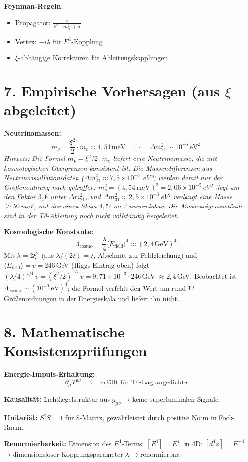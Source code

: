 	\textbf{Feynman-Regeln:}
	\begin{itemize}
		\item Propagator: $\frac{i}{k^2 - m_{\text{eff}}^2 + i\epsilon}$
		\item Vertex: $-i\lambda$ für $E^4$-Kopplung
		\item $\xi$-abhängige Korrekturen für Ableitungskopplungen
	\end{itemize}
	
	\section*{7. Empirische Vorhersagen (aus $\xi$ abgeleitet)}
	
	\textbf{Neutrinomassen:}
	\[
	m_\nu = \frac{\xi^2}{2} \cdot m_e \approx 4{,}54 \, \text{meV} \quad \Rightarrow \quad \Delta m_{21}^2 \sim 10^{-5} \, \text{eV}^2
	\]
	\textit{Hinweis: Die Formel $m_\nu = \xi^2/2 \cdot m_e$ liefert eine Neutrinomasse, die mit kosmologischen Obergrenzen konsistent ist. Die Massendifferenzen aus Neutrinooszillationsdaten ($\Delta m^2_{21} \approx 7{,}5 \times 10^{-5}$ eV²) werden damit nur der Größenordnung nach getroffen: $m_\nu^2 = (4{,}54\,\text{meV})^2 = 2{,}06\times10^{-5}$\,eV$^2$ liegt um den Faktor $3{,}6$ unter $\Delta m^2_{21}$, und $\Delta m^2_{31} \approx 2{,}5\times10^{-3}$\,eV$^2$ verlangt eine Masse $\geq 50$\,meV, mit der einen Skala $4{,}54$\,meV unvereinbar. Die Masseneigenzustände sind in der T0-Ableitung noch nicht vollständig hergeleitet.}
	
	\textbf{Kosmologische Konstante:}
	\[
	\Lambda_{\text{cosmo}} = \frac{\lambda}{4} \langle E_{\text{field}} \rangle^4 \approx (2{,}4\,\text{GeV})^4
	\]
	Mit $\lambda = 2\xi^2$ (aus $\lambda/(2\xi) = \xi$, Abschnitt zur Feldgleichung) und $\langle E_{\text{field}} \rangle = v = 246$\,GeV (Higgs-Eintrag oben) folgt $(\lambda/4)^{1/4}\,v = (\xi^2/2)^{1/4}\,v = 9{,}71\times10^{-3}\cdot 246$\,GeV $\approx 2{,}4$\,GeV. Beobachtet ist $\Lambda_{\text{cosmo}} \sim (10^{-3}\,\text{eV})^4$; die Formel verfehlt den Wert um rund $12$ Größenordnungen in der Energieskala und liefert ihn nicht.
	

	
	\section*{8. Mathematische Konsistenzprüfungen}
	
	\textbf{Energie-Impuls-Erhaltung:}
	\[
	\partial_\mu T^{\mu\nu} = 0 \quad \text{erfüllt für T0-Lagrangedichte}
	\]
	
	\textbf{Kausalität:} Lichtkegelstruktur aus $g_{\mu\nu}$ → keine superluminalen Signale.
	
	\textbf{Unitariät:} $S^\dagger S = 1$ für S-Matrix, gewährleistet durch positive Norm in Fock-Raum.
	
	\textbf{Renormierbarkeit:} Dimension des $E^4$-Terms: $[E^4] = E^4$, in 4D: $[d^4x] = E^{-4}$ → dimensionsloser Kopplungsparameter $\lambda$ → renormierbar.
	